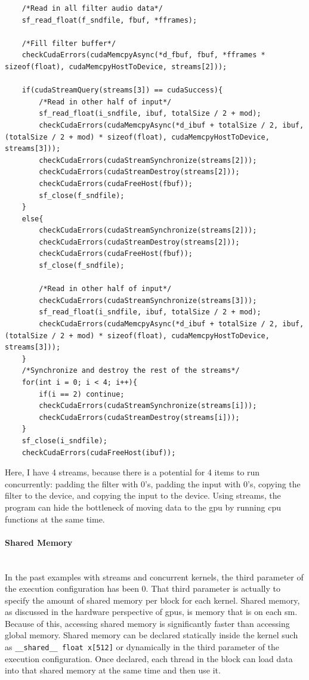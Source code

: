 \begin{verbatim}
	/*Read in all filter audio data*/
	sf_read_float(f_sndfile, fbuf, *fframes);

	/*Fill filter buffer*/
	checkCudaErrors(cudaMemcpyAsync(*d_fbuf, fbuf, *fframes * sizeof(float), cudaMemcpyHostToDevice, streams[2]));
	
	if(cudaStreamQuery(streams[3]) == cudaSuccess){
		/*Read in other half of input*/
		sf_read_float(i_sndfile, ibuf, totalSize / 2 + mod);
		checkCudaErrors(cudaMemcpyAsync(*d_ibuf + totalSize / 2, ibuf, (totalSize / 2 + mod) * sizeof(float), cudaMemcpyHostToDevice, streams[3]));
		checkCudaErrors(cudaStreamSynchronize(streams[2]));
		checkCudaErrors(cudaStreamDestroy(streams[2]));
		checkCudaErrors(cudaFreeHost(fbuf));
		sf_close(f_sndfile);
	}
	else{
		checkCudaErrors(cudaStreamSynchronize(streams[2]));
		checkCudaErrors(cudaStreamDestroy(streams[2]));
		checkCudaErrors(cudaFreeHost(fbuf));
		sf_close(f_sndfile);

		/*Read in other half of input*/
		checkCudaErrors(cudaStreamSynchronize(streams[3]));
		sf_read_float(i_sndfile, ibuf, totalSize / 2 + mod);
		checkCudaErrors(cudaMemcpyAsync(*d_ibuf + totalSize / 2, ibuf, (totalSize / 2 + mod) * sizeof(float), cudaMemcpyHostToDevice, streams[3]));		
	}
	/*Synchronize and destroy the rest of the streams*/
	for(int i = 0; i < 4; i++){
		if(i == 2) continue;
		checkCudaErrors(cudaStreamSynchronize(streams[i]));
		checkCudaErrors(cudaStreamDestroy(streams[i]));
	}	
	sf_close(i_sndfile);
	checkCudaErrors(cudaFreeHost(ibuf));
\end{verbatim}

Here, I have 4 streams, because there is a potential for 4 items to run concurrently: padding the filter with 0's, padding the input with 0's, copying the filter to the device, and copying the input to the device. Using streams, the program can hide the bottleneck of moving data to the \gls{gpu} by running \gls{cpu} functions at the same time.
\paragraph{Shared Memory} \hspace{0pt} \\
\indent In the past examples with streams and concurrent kernels, the third parameter of the execution configuration has been 0. That third parameter is actually to specify the amount of shared memory per block for each kernel. Shared memory, as discussed in the hardware perspective of \glspl{gpu}, is memory that is on each \gls{sm}. Because of this, accessing shared memory is significantly faster than accessing global memory. Shared memory can be declared statically inside the kernel such as \verb|__shared__ float x[512]| or dynamically in the third parameter of the execution configuration. Once declared, each thread in the block can load data into that shared memory at the same time and then use it. 

